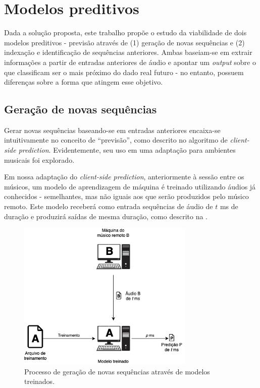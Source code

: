 \section{Modelos preditivos}

Dada a solução proposta, este trabalho propõe o estudo da viabilidade de dois modelos preditivos - previsão através de (1) geração de novas sequências e (2) indexação e identificação de sequências anteriores. Ambas baseiam-se em extrair informações a partir de entradas anteriores de áudio e apontar um \textit{output} sobre o que classificam ser o mais próximo do dado real futuro - no entanto, possuem diferenças sobre a forma que atingem esse objetivo.

\subsection{Geração de novas sequências}
\label{subsec:new_sequence_generator}

Gerar novas sequências baseando-se em entradas anteriores encaixa-se intuitivamente no conceito de ``previsão'', como descrito no algoritmo de \textit{client-side prediction}. Evidentemente, seu uso em uma adaptação para ambientes musicais foi explorado.

Em nossa adaptação do \textit{client-side prediction}, anteriormente à sessão entre os músicos, um modelo de aprendizagem de máquina é treinado utilizando áudios já conhecidos -  semelhantes, mas não iguais aos que serão produzidos pelo músico remoto. Este modelo receberá como entrada sequências de áudio de $t$ ms de duração e produzirá saídas de mesma duração, como descrito na .

\begin{figure}[htbp]
    \centering
    \includegraphics[width=0.75\textwidth]{images/prediction-model.png}
    \caption{Processo de geração de novas sequências através de modelos treinados.}
    \label{fig:generative_model}
\end{figure}

